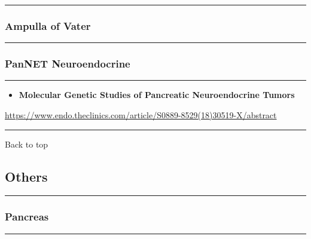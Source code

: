 \documentclass[]{article}
\providecommand{\tightlist}{%
  \setlength{\itemsep}{0pt}\setlength{\parskip}{0pt}}
\begin{document}
\begin{center}\rule{0.5\linewidth}{\linethickness}\end{center}

\hypertarget{ampulla-of-vater-2}{%
\subsubsection{Ampulla of Vater}\label{ampulla-of-vater-2}}

\begin{center}\rule{0.5\linewidth}{\linethickness}\end{center}

\hypertarget{pannet-neuroendocrine-2}{%
\subsubsection{PanNET Neuroendocrine}\label{pannet-neuroendocrine-2}}

\begin{center}\rule{0.5\linewidth}{\linethickness}\end{center}

\begin{itemize}
\tightlist
\item
  \textbf{Molecular Genetic Studies of Pancreatic Neuroendocrine Tumors}
\end{itemize}

\url{https://www.endo.theclinics.com/article/S0889-8529(18)30519-X/abstract}

\begin{center}\rule{0.5\linewidth}{\linethickness}\end{center}

Back to top

\pagebreak

\hypertarget{others}{%
\subsection{Others}\label{others}}

\begin{center}\rule{0.5\linewidth}{\linethickness}\end{center}

\hypertarget{pancreas-3}{%
\subsubsection{Pancreas}\label{pancreas-3}}

\begin{center}\rule{0.5\linewidth}{\linethickness}\end{center}
\end{document}
